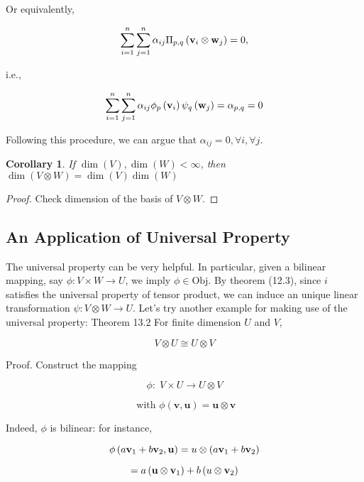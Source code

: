 \documentclass[11pt]{article}
\newtheorem{corollary}[theorem]{Corollary}
\begin{document}
Or equivalently,

\[
\mathop{\sum }\limits_{{i = 1}}^n\mathop{\sum }\limits_{{j = 1}}^n\alpha_{ij}{\Pi }_{p,q}\left( {{\bf v}_{i} \otimes  {\bf w}_{j}}\right)  = 0,
\]

i.e.,

\[
\mathop{\sum }\limits_{{i = 1}}^n\mathop{\sum }\limits_{{j = 1}}^n\alpha_{ij}{\phi }_{p}\left( {\bf v}_{i}\right) {\psi }_{q}\left( {\bf w}_{j}\right)  = \alpha_{p,q} = 0
\]

Following this procedure, we can argue that \(\alpha_{ij} = 0,\forall i,\forall j\).

\begin{corollary} If \(\dim \left( V\right) ,\dim \left( W\right)  < \infty\), then \(\dim \left( {V \otimes  W}\right)  = \dim \left( V\right) \dim \left( W\right)\)
\end{corollary}

\begin{proof} Check dimension of the basis of \(V \otimes  W\).
\end{proof}

\subsection{An Application of Universal Property}
The universal property can be very helpful. In particular, given a bilinear mapping, say \(\phi  : V \times  W \rightarrow  U\), we imply \(\phi  \in  \mathrm{{Obj}}\). By theorem (12.3), since \(i\) satisfies the universal property of tensor product, we can induce an unique linear transformation \(\psi  : V \otimes  W \rightarrow  U\). Let's try another example for making use of the universal property: Theorem 13.2 For finite dimension \(U\) and \(V\),

\[
V \otimes  U \cong  U \otimes  V
\]

Proof. Construct the mapping

\[
\phi  : \;V \times  U \rightarrow  U \otimes  V
\]

\[
\text{ with }\phi \left( {\mathbf{v},\mathbf{u}}\right)  = \mathbf{u} \otimes  \mathbf{v}
\]

Indeed, \(\phi\) is bilinear: for instance,

\[
\phi \left( {a{\bf v}_1 + b{\bf v}_2,\mathbf{u}}\right)  = u \otimes  \left( {a{\bf v}_1 + b{\bf v}_2}\right)
\]

\[
= a\left( {\mathbf{u} \otimes  {\bf v}_1}\right)  + b\left( {u \otimes  {\bf v}_2}\right)
\]
\end{document}
